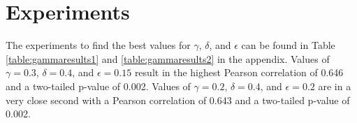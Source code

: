 \documentclass{article}
\begin{document}






\section{Experiments} \label{sec:experiments} %

The experiments to find the best values for $\gamma$, $\delta$, and $\epsilon$ can be found in Table \ref{table:gammaresults1} and \ref{table:gammaresults2} in the appendix. Values of $\gamma = 0.3$, $\delta = 0.4$, and $\epsilon = 0.15$ result in the highest Pearson correlation of 0.646 and a two-tailed p-value of 0.002. Values of $\gamma = 0.2$, $\delta = 0.4$, and $\epsilon = 0.2$ are in a very close second with a Pearson correlation of 0.643 and a two-tailed p-value of 0.002. 
\end{document}
